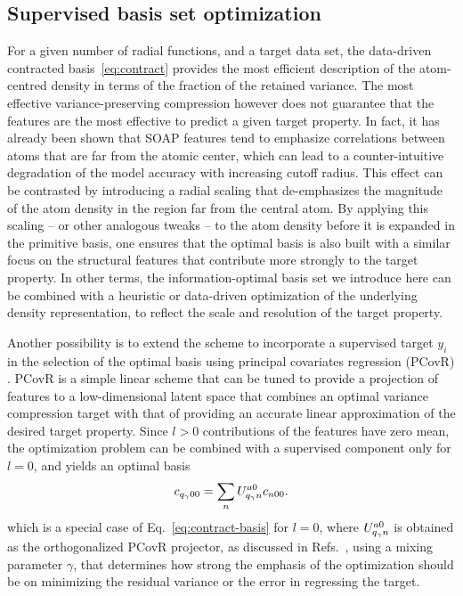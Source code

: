 \subsection{Supervised basis set optimization}
For a given number of radial functions, and a target data set, the data-driven contracted basis~\eqref{eq:contract} provides the most efficient description of the atom-centred density in terms of the fraction of the retained variance.
The most effective variance-preserving compression however does not guarantee that the features are the most effective to predict a given target property.
In fact, it has already been shown that SOAP features tend to emphasize correlations between atoms that are far from the atomic center, which can lead to a counter-intuitive degradation of the model accuracy with increasing cutoff radius\cite{bart+17sa,will+18pccp}. 
This effect can be contrasted by introducing a radial scaling\cite{huan-vonl16jcp,will+18pccp} that de-emphasizes the magnitude of the atom density in the region far from the central atom. 
By applying this scaling -- or other analogous tweaks\cite{caro2019optimizing} -- to the atom density before it is expanded in the primitive basis, one ensures that the optimal basis is also built with a similar focus on the structural features that contribute more strongly to the target property.
In other terms, the information-optimal basis set we introduce here can be combined with a heuristic or data-driven optimization of the underlying density representation, to reflect the scale and resolution of the target property.


Another possibility is to extend the scheme to incorporate a supervised target $y_i$ in the selection of the optimal basis using principal covariates regression (PCovR) \cite{dejo-kier92cils,helf+20mlst}.
PCovR is a simple linear scheme that can be tuned to provide a projection of features to a low-dimensional latent space that combines an optimal variance compression target with that of providing an accurate linear approximation of the desired target property. 
Since $l>0$ contributions of the features have zero mean, the optimization problem can be combined with a supervised component only for $l=0$, and yields an optimal basis
\begin{equation}
  c_{q_\gamma00} = \sum_n U^{a0}_{q_\gamma n} c_{n00}.
\end{equation}
which is a special case of Eq.~\eqref{eq:contract-basis} for $l=0$, 
where $U^{a0}_{q_\gamma n}$ is obtained as the orthogonalized PCovR projector, as discussed in Refs.~, using a mixing parameter $\gamma$, that determines how strong the emphasis of the optimization should be on minimizing the residual variance or the error in regressing the target.


